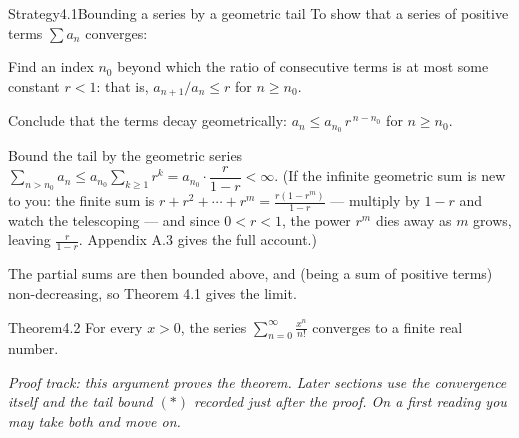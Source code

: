 \documentclass[a4paper,12pt,oneside]{memoir}
\begin{document}
\begin{envstrategy}{Strategy}{4.1}{Bounding a series by a geometric tail}
To show that a series of positive terms \(\sum a_{n}\) converges:

\begin{steps}
  \item Find an index \(n_{0}\) beyond which the ratio of consecutive terms is at most some constant \(r < 1\): that is, \(a_{n + 1}/a_{n} \le r\) for \(n \ge n_{0}\).
  \item Conclude that the terms decay geometrically: \(a_{n} \le a_{n_{0}} \, r^{\,n - n_{0}}\) for \(n \ge n_{0}\).
  \item Bound the tail by the geometric series \(\sum_{n > n_{0}} a_{n} \le a_{n_{0}} \sum_{k \ge 1} r^{k} = a_{n_{0}} \cdot \dfrac{r}{1 - r} < \infty\). (If the infinite geometric sum is new to you: the finite sum is \(r + r^{2} + \cdots + r^{m} = \frac{r(1 - r^{m})}{1 - r}\) — multiply by \(1 - r\) and watch the telescoping — and since \(0 < r < 1\), the power \(r^{m}\) dies away as \(m\) grows, leaving \(\frac{r}{1 - r}\). Appendix A.3 gives the full account.)
  \item The partial sums are then bounded above, and (being a sum of positive terms) non-decreasing, so Theorem 4.1 gives the limit.
\end{steps}
\end{envstrategy}
\begin{envtheorem}{Theorem}{4.2}{}
For every \(x > 0\), the series \(\displaystyle\sum_{n = 0}^{\infty} \frac{x^{n}}{n!}\) converges to a finite real number.
\end{envtheorem}
\emph{Proof track: this argument proves the theorem. Later sections use the convergence itself and the tail bound \((*)\) recorded just after the proof. On a first reading you may take both and move on.}
\end{document}
